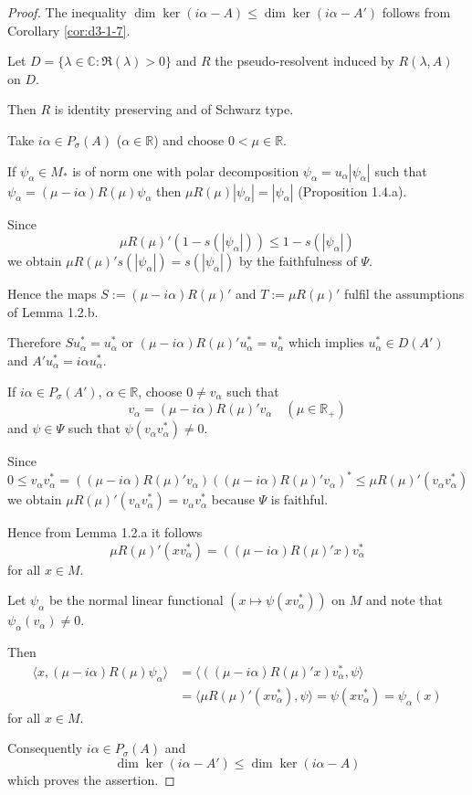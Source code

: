 \begin{proof}
The inequality $\dim \ker(i\alpha - A) \leq \dim \ker(i\alpha - A')$ follows from Corollary \ref{cor:d3-1-7}.

Let $D = \{\lambda \in \mathbb{C} : \Re(\lambda) > 0\}$ and $R$ the pseudo-resolvent induced by $R(\lambda,A)$ on $D$.

Then $R$ is identity preserving and of Schwarz type.

Take $i\alpha \in P_{\sigma}(A)$ ($\alpha \in \mathbb{R}$) and choose $0 < \mu \in \mathbb{R}$.

If $\psi_{\alpha} \in M_{*}$ is of norm one with polar decomposition $\psi_{\alpha} = u_{\alpha}|\psi_{\alpha}|$ such that $\psi_{\alpha} = (\mu - i\alpha)R(\mu)\psi_{\alpha}$ then $\mu R(\mu)|\psi_{\alpha}| = |\psi_{\alpha}|$ (Proposition 1.4.a).

Since
\[
\mu R(\mu)'(1 - s(|\psi_{\alpha}|)) \leq 1 - s(|\psi_{\alpha}|)
\]
we obtain $\mu R(\mu)'s(|\psi_{\alpha}|) = s(|\psi_{\alpha}|)$ by the faithfulness of $\Psi$.

Hence the maps $S := (\mu - i\alpha)R(\mu)'$ and $T := \mu R(\mu)'$ fulfil the assumptions of Lemma 1.2.b.

Therefore $Su_{\alpha}^{*} = u_{\alpha}^{*}$ or $(\mu-i\alpha)R(\mu)'u_{\alpha}^{*} = u_{\alpha}^{*}$ which implies $u_{\alpha}^{*} \in D(A')$ and $A'u_{\alpha}^{*} = i\alpha u_{\alpha}^{*}$.

If $i\alpha \in P_{\sigma}(A')$, $\alpha \in \mathbb{R}$, choose $0 \neq v_{\alpha}$ such that
\[
v_{\alpha} = (\mu - i\alpha)R(\mu)'v_{\alpha} \quad (\mu \in \mathbb{R}_{+})
\]
and $\psi \in \Psi$ such that $\psi(v_{\alpha}v_{\alpha}^{*}) \neq 0$.

Since
\[
0 \leq v_{\alpha}v_{\alpha}^{*} = ((\mu - i\alpha)R(\mu)'v_{\alpha})((\mu - i\alpha)R(\mu)'v_{\alpha})^{*} \leq \mu R(\mu)'(v_{\alpha}v_{\alpha}^{*})
\]
we obtain $\mu R(\mu)'(v_{\alpha}v_{\alpha}^{*}) = v_{\alpha}v_{\alpha}^{*}$ because $\Psi$ is faithful.


Hence from Lemma 1.2.a it follows
\[
\mu R(\mu)'(xv_{\alpha}^{*}) = ((\mu - i\alpha)R(\mu)'x)v_{\alpha}^{*}
\]
for all $x \in M$.

Let $\psi_{\alpha}$ be the normal linear functional $(x \mapsto \psi(xv_{\alpha}^{*}))$ on $M$ and note that $\psi_{\alpha}(v_{\alpha}) \neq 0$.

Then
\begin{align*}
\langle x, (\mu - i\alpha)R(\mu)\psi_{\alpha} \rangle &= \langle ((\mu - i\alpha)R(\mu)'x)v_{\alpha}^{*},\psi \rangle \\
&= \langle \mu R(\mu)'(xv_{\alpha}^{*}),\psi \rangle = \psi(xv_{\alpha}^{*}) = \psi_{\alpha}(x)
\end{align*}
for all $x \in M$.

Consequently $i\alpha \in P_{\sigma}(A)$ and
\[
\dim \ker(i\alpha - A') \leq \dim \ker(i\alpha - A)
\]
which proves the assertion.
\end{proof}

